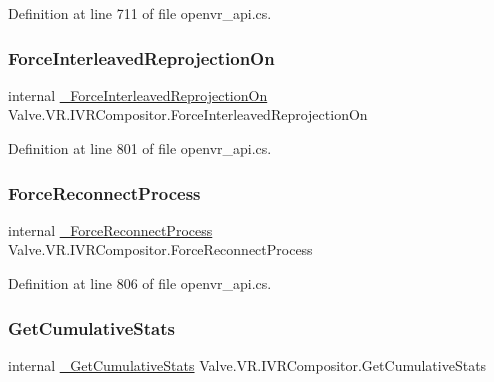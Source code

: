 Definition at line 711 of file openvr\+\_\+api.\+cs.

\mbox{\label{struct_valve_1_1_v_r_1_1_i_v_r_compositor_ac8929e7619ebe2ffa6a379f5ff7e29cd}} 
\subsubsection{\texorpdfstring{ForceInterleavedReprojectionOn}{ForceInterleavedReprojectionOn}}
{\footnotesize\ttfamily internal \mbox{\hyperlink{struct_valve_1_1_v_r_1_1_i_v_r_compositor_a36094af51a8c04b9a3e162457ce669b9}{\+\_\+\+Force\+Interleaved\+Reprojection\+On}} Valve.\+V\+R.\+I\+V\+R\+Compositor.\+Force\+Interleaved\+Reprojection\+On}



Definition at line 801 of file openvr\+\_\+api.\+cs.

\mbox{\label{struct_valve_1_1_v_r_1_1_i_v_r_compositor_ae9c9a863909027b2a1abb60d474010fe}} 
\subsubsection{\texorpdfstring{ForceReconnectProcess}{ForceReconnectProcess}}
{\footnotesize\ttfamily internal \mbox{\hyperlink{struct_valve_1_1_v_r_1_1_i_v_r_compositor_a41854e10b434af0c1747fdb05b91098f}{\+\_\+\+Force\+Reconnect\+Process}} Valve.\+V\+R.\+I\+V\+R\+Compositor.\+Force\+Reconnect\+Process}



Definition at line 806 of file openvr\+\_\+api.\+cs.

\mbox{\label{struct_valve_1_1_v_r_1_1_i_v_r_compositor_aa3cf0b9048bdc0ee3e1c0a9a431bebe1}} 
\subsubsection{\texorpdfstring{GetCumulativeStats}{GetCumulativeStats}}
{\footnotesize\ttfamily internal \mbox{\hyperlink{struct_valve_1_1_v_r_1_1_i_v_r_compositor_a5b17db2366df6ea7d74ca5b03c9037d4}{\+\_\+\+Get\+Cumulative\+Stats}} Valve.\+V\+R.\+I\+V\+R\+Compositor.\+Get\+Cumulative\+Stats}



